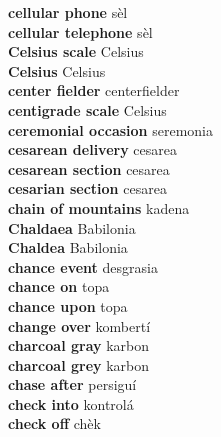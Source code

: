 \textbf{ cellular phone  } sèl \\
\textbf{ cellular telephone  } sèl \\
\textbf{ Celsius scale  } Celsius \\
\textbf{ Celsius  } Celsius \\
\textbf{ center fielder  } centerfielder \\
\textbf{ centigrade scale  } Celsius \\
\textbf{ ceremonial occasion  } seremonia \\
\textbf{ cesarean delivery  } cesarea \\
\textbf{ cesarean section  } cesarea \\
\textbf{ cesarian section  } cesarea \\
\textbf{ chain of mountains  } kadena \\
\textbf{ Chaldaea  } Babilonia \\
\textbf{ Chaldea  } Babilonia \\
\textbf{ chance event  } desgrasia \\
\textbf{ chance on  } topa \\
\textbf{ chance upon  } topa \\
\textbf{ change over  } kombertí \\
\textbf{ charcoal gray  } karbon \\
\textbf{ charcoal grey  } karbon \\
\textbf{ chase after  } persiguí \\
\textbf{ check into  } kontrolá \\
\textbf{ check off  } chèk \\
